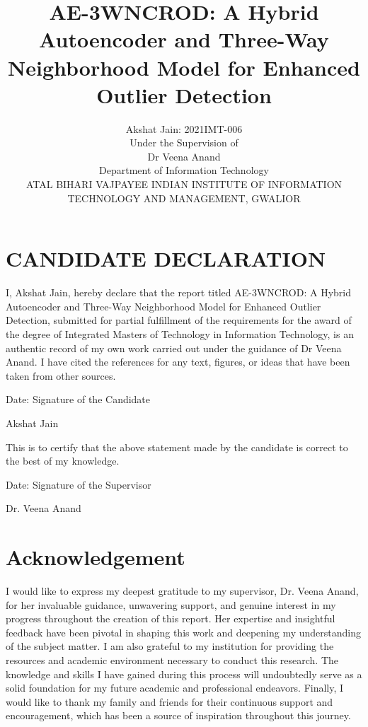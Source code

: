 \documentclass[12pt,a4paper]{article}
\title{AE-3WNCROD: A Hybrid Autoencoder and Three-Way Neighborhood Model for Enhanced Outlier Detection}
\author{Akshat Jain: 2021IMT-006\\Under the Supervision of\\Dr Veena Anand\\Department of Information Technology\\ATAL BIHARI VAJPAYEE INDIAN INSTITUTE OF INFORMATION TECHNOLOGY AND MANAGEMENT, GWALIOR}
\date{}
\begin{document}
\maketitle

\section*{CANDIDATE DECLARATION}

I, Akshat Jain, hereby declare that the report titled AE-3WNCROD: A Hybrid Autoencoder and Three-Way Neighborhood Model for Enhanced Outlier Detection, submitted for partial fulfillment of the requirements for the award of the degree of Integrated Masters of Technology in Information Technology, is an authentic record of my own work carried out under the guidance of Dr Veena Anand. I have cited the references for any text, figures, or ideas that have been taken from other sources.

\vspace{1cm}
Date: \quad Signature of the Candidate

Akshat Jain

\vspace{1cm}
This is to certify that the above statement made by the candidate is correct to the best of my knowledge.

\vspace{1cm}
Date: \quad Signature of the Supervisor

Dr. Veena Anand

\newpage

\section*{Acknowledgement}

I would like to express my deepest gratitude to my supervisor, Dr. Veena Anand, for her invaluable guidance, unwavering support, and genuine interest in my progress throughout the creation of this report. Her expertise and insightful feedback have been pivotal in shaping this work and deepening my understanding of the subject matter. I am also grateful to my institution for providing the resources and academic environment necessary to conduct this research. The knowledge and skills I have gained during this process will undoubtedly serve as a solid foundation for my future academic and professional endeavors. Finally, I would like to thank my family and friends for their continuous support and encouragement, which has been a source of inspiration throughout this journey.
\end{document}
